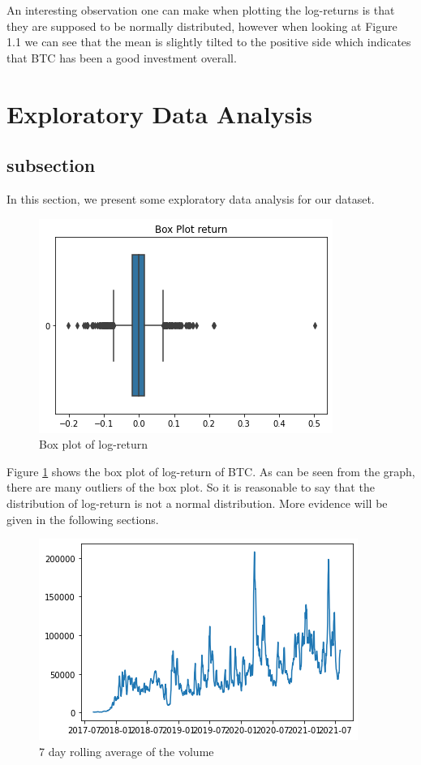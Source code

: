 \documentclass[twoside]{report}
\begin{document}
\begin{spacing}{1}
 An interesting observation one can make when plotting the log-returns is that they are supposed to be normally distributed, however when looking at Figure 1.1 we can see that the mean is slightly tilted to the positive side which indicates that BTC has been a good investment overall.
 
 
 \section{Exploratory Data Analysis}
 
 \subsection{subsection}
In this section, we present some exploratory data analysis for our dataset.

\begin{figure}[!htbp]
    \centering
    \includegraphics[scale = 0.5]{Images/Box Plot of Return.png}
    \caption{Box plot of log-return}
    \label{log return box}
\end{figure}

Figure \ref{log return box} shows the box plot of log-return of BTC. As can be seen from the graph, there are many outliers of the box plot. So it is reasonable to say that the distribution of log-return is not a normal distribution. More evidence will be given in the following sections.

\begin{figure}[!htbp]
    \centering
    \includegraphics[scale = 0.5]{Images/Volume Rolling Average.png}
    \caption{7 day rolling average of the volume}
    \label{7day rolling volume}
\end{figure}


\end{spacing}
\end{document}
